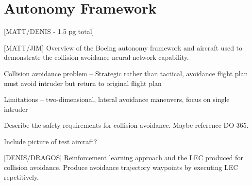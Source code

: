 \section{Autonomy Framework}

[MATT/DENIS - 1.5 pg total]

[MATT/JIM] Overview of the Boeing autonomy framework and aircraft used to demonstrate the collision avoidance neural network capability.

Collision avoidance problem -- Strategic rather than tactical, avoidance flight plan must avoid intruder but return to original flight plan

Limitations --  two-dimensional, lateral avoidance maneuvers, focus on single intruder

Describe the safety requirements for collision avoidance.  Maybe reference DO-365. 

Include picture of test aircraft?

[DENIS/DRAGOS] Reinforcement learning approach and the LEC produced for collision avoidance.  
Produce avoidance trajectory waypoints  by executing LEC repetitively. 
